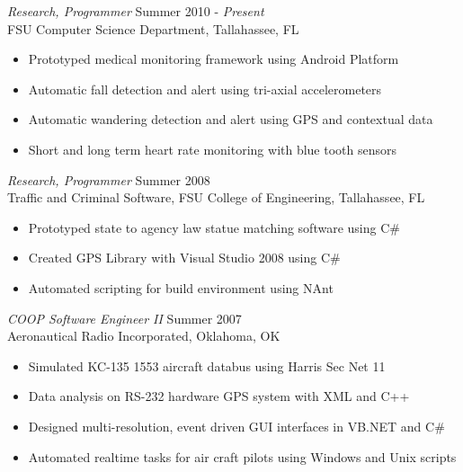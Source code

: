 \documentclass[margin]{res}
\begin{document}
\begin{resume}
{\sl Research, Programmer} \hfill            Summer 2010 - \textit{Present} \\
FSU Computer Science Department, Tallahassee, FL
\begin{itemize}  \itemsep -5pt %
\item Prototyped medical monitoring framework using Android Platform
\item Automatic fall detection and alert using tri-axial accelerometers
\item Automatic wandering detection and alert using GPS and contextual data
\item Short and long term heart rate monitoring with blue tooth sensors
\end{itemize} 


{\sl Research, Programmer} \hfill            Summer 2008 \\
Traffic and Criminal Software, FSU College of Engineering, Tallahassee, FL
\begin{itemize}  \itemsep -5pt %
\item Prototyped state to agency law statue matching software using C\#
\item Created GPS Library with Visual Studio 2008 using C\#
\item Automated scripting for build environment using NAnt
\end{itemize} 

{\sl COOP Software Engineer II} \hfill        Summer 2007 \\
Aeronautical Radio Incorporated, Oklahoma, OK
\begin{itemize} \itemsep -5pt %
\item Simulated KC-135 1553 aircraft databus using Harris Sec Net 11
\item Data analysis on RS-232 hardware GPS system with XML and C++
\item Designed multi-resolution, event driven GUI interfaces in VB.NET and C\#
\item Automated realtime tasks for air craft pilots using Windows and Unix scripts
\end{itemize} 
 

\end{resume}
\end{document}
